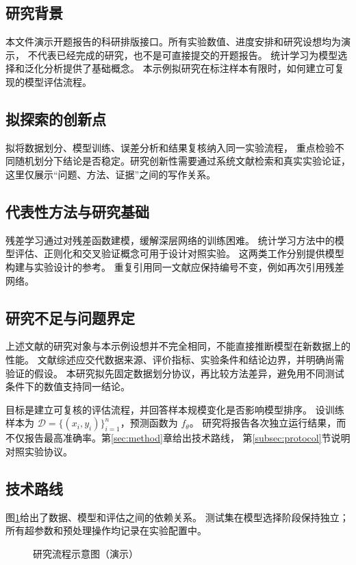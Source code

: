 \begin{proposalbody}
\label{sec:background}
\subsection{研究背景}
本文件演示开题报告的科研排版接口。所有实验数值、进度安排和研究设想均为演示，
不代表已经完成的研究，也不是可直接提交的开题报告。
统计学习为模型选择和泛化分析提供了基础概念\cite{li2019statistical}。
本示例拟研究在标注样本有限时，如何建立可复现的模型评估流程。

\subsection{拟探索的创新点}
拟将数据划分、模型训练、误差分析和结果复核纳入同一实验流程，
重点检验不同随机划分下结论是否稳定。研究创新性需要通过系统文献检索和真实实验论证，
这里仅展示“问题、方法、证据”之间的写作关系。

\label{sec:related}
\subsection{代表性方法与研究基础}
残差学习通过对残差函数建模，缓解深层网络的训练困难\cite{he2016resnet}。
统计学习方法中的模型评估、正则化和交叉验证概念可用于设计对照实验\cite[19--24]{li2019statistical}。
这两类工作分别提供模型构建与实验设计的参考\cite{li2019statistical,he2016resnet}。
重复引用同一文献应保持编号不变，例如再次引用残差网络\cite{he2016resnet}。

\subsection{研究不足与问题界定}
上述文献的研究对象与本示例设想并不完全相同，不能直接推断模型在新数据上的性能。
文献综述应交代数据来源、评价指标、实验条件和结论边界，并明确尚需验证的假设。
本研究拟先固定数据划分协议，再比较方法差异，避免用不同测试条件下的数值支持同一结论。

\label{sec:goals}
目标是建立可复核的评估流程，并回答样本规模变化是否影响模型排序。
设训练样本为 $\mathcal{D}=\{(x_i,y_i)\}_{i=1}^{n}$，预测函数为 $f_\theta$。
研究将报告各次独立运行结果，而不仅报告最高准确率。第\ref{sec:method}章给出技术路线，
第\ref{subsec:protocol}节说明对照实验协议。

\label{sec:method}
\subsection{技术路线}
图\ref{fig:pipeline}给出了数据、模型和评估之间的依赖关系。
测试集在模型选择阶段保持独立；所有超参数和预处理操作均记录在实验配置中。
\begin{figure}[htbp]
  \centering
  
  \caption{研究流程示意图（演示）}\label{fig:pipeline}
\end{figure}


\end{proposalbody}
